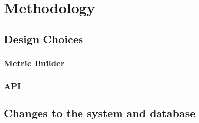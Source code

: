 \chapter{Methodology}

\section{Design Choices}

\subsection{Metric Builder}

\subsection{API}

\section{Changes to the system and database}
